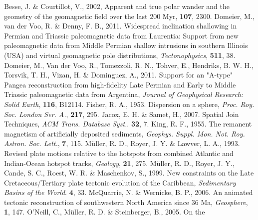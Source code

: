\begin{thebibliography}{}
  Besse, J. \& Courtillot, V., 2002, Apparent and true polar wander and the
  geometry of the geomagnetic field over the last 200 Myr, \jgr{}\textbf{107},
  2300.
  Domeier, M., van der Voo, R. \& Denny, F. B., 2011. Widespread inclination
  shallowing in Permian and Triassic paleomagnetic data from Laurentia: Support
  from new paleomagnetic data from Middle Permian shallow intrusions in
  southern Illinois (USA) and virtual geomagnetic pole distributions,
  \textit{Tectonophysics}, \textbf{511}, 38.
  Domeier, M., Van der Voo, R., Tomezzoli, R. N., Tohver, E., Hendriks, B. W.
  H., Torsvik, T. H., Vizan, H. \& Dominguez, A., 2011. Support for an "A-type"
  Pangea reconstruction from high-fidelity Late Permian and Early to Middle
  Triassic paleomagnetic data from Argentina, \textit{Journal of Geophysical
  Research: Solid Earth}, \textbf{116}, B12114.
  Fisher, R. A., 1953. Dispersion on a sphere, \textit{Proc. Roy. Soc. London
  Ser. A.}, \textbf{217}, 295.
  Jacox, E. H. \& Samet, H., 2007. Spatial Join Techniques, \textit{ACM Trans.
  Database Syst.}. \textbf{32}, 7.
  King, R. F., 1955. The remanent magnetism of artificially deposited sediments,
  \textit{Geophys. Suppl. Mon. Not. Roy. Astron. Soc. Lett.}, \textbf{7},
  115.
  M{\"{u}}ller, R. D., Royer, J. Y. \& Lawver, L. A., 1993. Revised plate
  motions relative to the hotspots from combined Atlantic and Indian-Ocean
  hotspot tracks, \textit{Geology}, \textbf{21}, 275.
  M{\"{u}}ller, R. D., Royer, J. Y., Cande, S. C., Roest, W. R. \& Maschenkov,
  S., 1999. New constraints on the Late Cretaceous/Tertiary plate tectonic
  evolution of the Caribbean, \textit{Sedimentary Basins of the World}.
  \textbf{4}, 33.
  McQuarrie, N. \& Wernicke, B. P., 2006. An animated tectonic reconstruction of
  southwestern North America since 36 Ma, \textit{Geosphere}, \textbf{1},
  147.
  O'Neill, C., M{\"{u}}ller, R. D. \& Steinberger, B., 2005. On the

\end{thebibliography}
